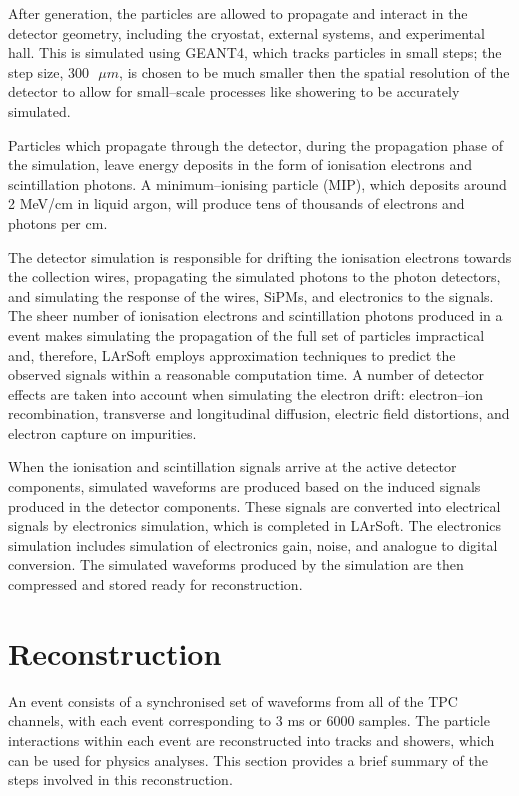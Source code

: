 After generation, the particles are allowed to propagate and interact in the 
detector geometry, including the cryostat, external systems, and experimental
hall. This is simulated using GEANT4\cite{Agostinelli:2002hh}, which tracks 
particles in small steps; the step size, $300 \mbox{ } \mu m$, is chosen to be 
much smaller then the spatial resolution of the detector to allow for 
small--scale processes like showering to be accurately simulated. 

Particles which propagate through the detector, during the propagation phase of
the simulation, leave energy deposits in the form of ionisation electrons and
scintillation photons. A minimum--ionising particle (MIP), which deposits 
around 2 MeV/cm in liquid argon, will produce tens of thousands of electrons 
and photons per cm.

The detector simulation is responsible for drifting the ionisation electrons 
towards the collection wires, propagating the simulated photons to the photon 
detectors, and simulating the response of the wires, SiPMs, and electronics to 
the signals. The sheer number of ionisation electrons and scintillation 
photons produced in a \protodune{} event makes simulating the propagation of 
the full set of particles impractical and, therefore, LArSoft employs 
approximation techniques to predict the observed signals within a reasonable 
computation time. A number of detector effects are taken into account when 
simulating the electron drift: electron--ion recombination, transverse and 
longitudinal diffusion, electric field distortions, and electron capture on 
impurities. 

When the ionisation and scintillation signals arrive at the active detector 
components, simulated waveforms are produced based on the induced signals 
produced in the detector components. These signals are converted into 
electrical signals by electronics simulation, which is completed in LArSoft. 
The electronics simulation includes simulation of electronics gain, noise, 
and analogue to digital conversion. The simulated waveforms produced by the 
\protodune{} simulation are then compressed and stored ready for reconstruction.

\section{Reconstruction} \label{sec:reconstruction}

An event consists of a synchronised set of waveforms from all of the TPC 
channels, with each event corresponding to 3 ms or 6000 samples. The particle
interactions within each event are reconstructed into tracks and showers, 
which can be used for physics analyses. This section provides a brief summary 
of the steps involved in this reconstruction.

